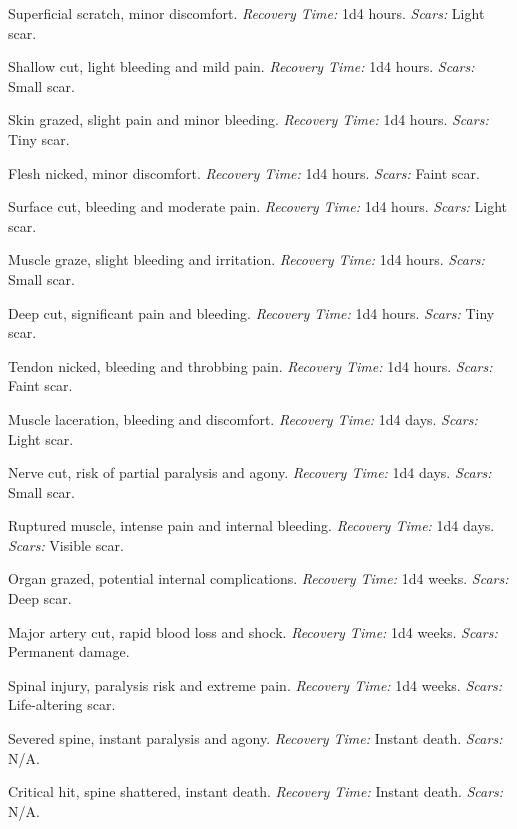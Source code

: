 \documentclass[12pt]{book}  %
\begin{document}
\begin{description}[labelwidth=1.5em, leftmargin=*, itemsep=0.4em]
    \item[1 -] Superficial scratch, minor discomfort. \textit{Recovery Time:} 1d4 hours. \textit{Scars:} Light scar.
    \item[2 -] Shallow cut, light bleeding and mild pain. \textit{Recovery Time:} 1d4 hours. \textit{Scars:} Small scar.
    \item[3 -] Skin grazed, slight pain and minor bleeding. \textit{Recovery Time:} 1d4 hours. \textit{Scars:} Tiny scar.
    \item[4 -] Flesh nicked, minor discomfort. \textit{Recovery Time:} 1d4 hours. \textit{Scars:} Faint scar.
    \item[5 -] Surface cut, bleeding and moderate pain. \textit{Recovery Time:} 1d4 hours. \textit{Scars:} Light scar.
    \item[6 -] Muscle graze, slight bleeding and irritation. \textit{Recovery Time:} 1d4 hours. \textit{Scars:} Small scar.
    \item[7 -] Deep cut, significant pain and bleeding. \textit{Recovery Time:} 1d4 hours. \textit{Scars:} Tiny scar.
    \item[8 -] Tendon nicked, bleeding and throbbing pain. \textit{Recovery Time:} 1d4 hours. \textit{Scars:} Faint scar.
    \item[9 -] Muscle laceration, bleeding and discomfort. \textit{Recovery Time:} 1d4 days. \textit{Scars:} Light scar.
    \item[10 -] Nerve cut, risk of partial paralysis and agony. \textit{Recovery Time:} 1d4 days. \textit{Scars:} Small scar.
    \item[11 -] Ruptured muscle, intense pain and internal bleeding. \textit{Recovery Time:} 1d4 days. \textit{Scars:} Visible scar.
    \item[12 -] Organ grazed, potential internal complications. \textit{Recovery Time:} 1d4 weeks. \textit{Scars:} Deep scar.
    \item[13 -] Major artery cut, rapid blood loss and shock. \textit{Recovery Time:} 1d4 weeks. \textit{Scars:} Permanent damage.
    \item[14 -] Spinal injury, paralysis risk and extreme pain. \textit{Recovery Time:} 1d4 weeks. \textit{Scars:} Life-altering scar.
    \item[15 -] Severed spine, instant paralysis and agony. \textit{Recovery Time:} Instant death. \textit{Scars:} N/A.
    \item[16 -] Critical hit, spine shattered, instant death. \textit{Recovery Time:} Instant death. \textit{Scars:} N/A.

\end{description}
\end{document}
